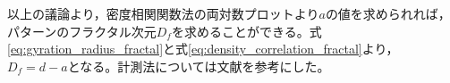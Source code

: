 \documentclass[autodetect-engine,dvi=dvipdfmx,a4paper,ja=standard,oneside,openany,11pt]{bxjsbook}
\begin{document}
以上の議論より，密度相関関数法の両対数プロットより$a$の値を求められれば，パターンのフラクタル次元$D_f$を求めることができる。式\ref{eq:gyration_radius_fractal}と式\ref{eq:density_correlation_fractal}より，$D_f=d-a$となる。計測法については文献\cite{フラクタルの物理Ⅰ}を参考にした。


\ifdraft{
  
  
}{}
\end{document}
